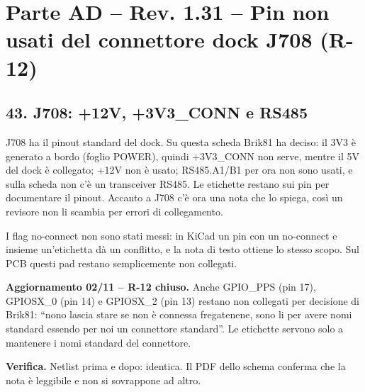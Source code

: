 \clearpage
\section[Parte AD – Rev. 1.31 – Pin non usati del connettore dock J708 (R-12)]{Parte AD – Rev. 1.31 – Pin non usati del connettore dock J708 (R-12)}

\subsection[43. J708: +12V, +3V3\_\allowbreak{}CONN e RS485]{43. J708: +12V, +3V3\_\allowbreak{}CONN e RS485}

J708 ha il pinout standard del dock. Su questa scheda Brik81 ha deciso: il 3V3 è generato a bordo (foglio POWER), quindi +3V3\_\allowbreak{}CONN non serve, mentre il 5V del dock è collegato; +12V non è usato; RS485.A1/\allowbreak{}B1 per ora non sono usati, e sulla scheda non c'è un transceiver RS485. Le etichette restano sui pin per documentare il pinout. Accanto a J708 c'è ora una nota che lo spiega, così un revisore non li scambia per errori di collegamento.

I flag no-connect non sono stati messi: in KiCad un pin con un no-connect e insieme un'etichetta dà un conflitto, e la nota di testo ottiene lo stesso scopo. Sul PCB questi pad restano semplicemente non collegati.

\textbf{Aggiornamento 02/\allowbreak{}11 – R-12 chiuso.} Anche GPIO\_\allowbreak{}PPS (pin 17), GPIOSX\_\allowbreak{}0 (pin 14) e GPIOSX\_\allowbreak{}2 (pin 13) restano non collegati per decisione di Brik81: \textquotedblleft{}nono lascia stare se non è connessa fregatenene, sono li per avere nomi standard essendo per noi un connettore standard\textquotedblright{}. Le etichette servono solo a mantenere i nomi standard del connettore.

\textbf{Verifica.} Netlist prima e dopo: identica. Il PDF dello schema conferma che la nota è leggibile e non si sovrappone ad altro.
